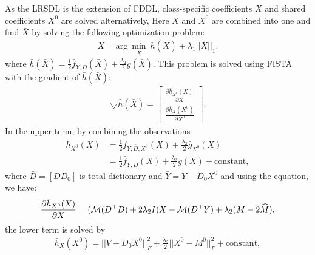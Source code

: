 As the LRSDL is the extension of FDDL, class-specific coefficients $X$ and shared coefficients $X^0$ are solved alternatively, Here $X$ and $X^0$ are combined into one and find $\bar{X}$ by solving the following optimization problem:%
\begin{equation}
\begin{aligned}
\bar{X} = \mathrm{arg}\ \underset{\bar{X}}{\min}\ {\bar{h}(\bar{X})} + \lambda_1 ||\bar{X}||_1.
\end{aligned}
\label{eq:GRAD3}
\end{equation}
where $\bar{h}(\bar{X}) = \frac{1}{2} \bar{f}_{Y,\bar{D}}(\bar{X}) + \frac{\lambda_2}{2}\bar{g}(\bar{X})$. This problem is solved using FISTA with the gradient of $\bar{h}(\bar{X})$:
\begin{equation}
\begin{aligned}
\bigtriangledown \bar{h}(\bar{X}) = 
\begin{bmatrix} \frac{\partial \bar{h}_{X^0}(X)}{\partial X} \\ \frac{\partial \bar{h}_{X}(X^0)}{\partial X^0} \end{bmatrix}.
\end{aligned}
\label{eq:GRAD4}
\end{equation}
\noindent
In the upper term, by combining the observations
\begin{equation}
\begin{aligned}
\bar{h}_{X^0}(X) & = \frac{1}{2}\bar{f}_{Y, \bar{D},X^0} (X) + \frac{\lambda_2}{2}\bar{g}_{X^0}(X)\\
& = \frac{1}{2}\bar{f}_{\bar{Y},{D}} (X) + \frac{\lambda_2}{2}{g}(X) + \text{constant},
\end{aligned}
\label{eq:GRAD5}
\end{equation}
where $\bar{D} = [D D_0]$ is total dictionary  and $\bar{Y} = Y - D_0X^0$ 
and using the equation, we have:
\begin{equation}
\begin{aligned}
\frac{\partial \bar{h}_{X^0}(X)}{\partial X} = (\mathcal{M} (D^\top D) + 2 \lambda_2 I)X - \mathcal{M}(D^\top \bar{Y})+\lambda_2(M-2 \widehat{M}).
\end{aligned}
\label{eq:GRAD6}
\end{equation}
the lower term is solved by 
\begin{equation}
\begin{aligned}
\bar{h}_X(X^0) = ||V-D_0X^0||_F^2 + \frac{\lambda_2}{2}||X^0 - M^0||_F^2 + \text{constant},
\end{aligned}
\label{eq:GRAD7}
\end{equation}
